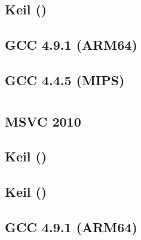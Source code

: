 

\subsection{\Optimizing Keil (\ThumbMode)}



\subsection{\Optimizing GCC 4.9.1 (ARM64)}



\subsection{\Optimizing GCC 4.4.5 (MIPS)}




\section{}

\subsection{\Optimizing MSVC 2010}



\subsection{\Optimizing Keil (\ARMMode)}



\subsection{\Optimizing Keil (\ThumbMode)}



\subsection{\Optimizing GCC 4.9.1 (ARM64)}

